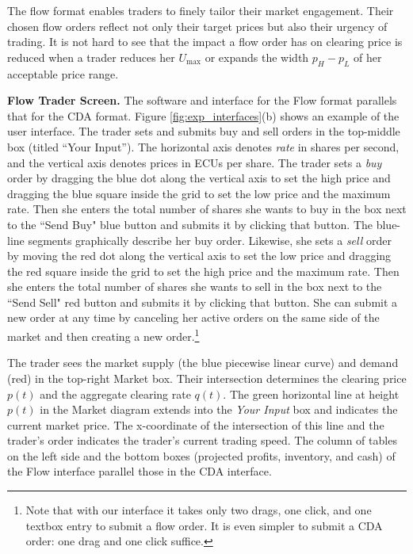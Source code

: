 \documentclass[12pt]{article}
\begin{document}
The flow format enables traders to finely tailor their market engagement. Their chosen flow orders reflect not only their target prices but also their urgency of trading. It is not hard to see that the impact a flow order has on clearing price is reduced when a trader reduces her $U_{\max}$ or expands the width $p_H - p_L$ of her acceptable price range.  

\bigskip
\noindent
\textbf{Flow Trader Screen.} 
The software and interface for the Flow format parallels that for the CDA format. 
Figure \ref{fig:exp_interfaces}(b) shows an example of the user interface.  
The trader sets and submits buy and sell orders in the top-middle box (titled ``Your Input''). The horizontal axis denotes \textit{rate} in shares per second, and the vertical axis denotes prices in ECUs per share. 
The trader sets a \textit{buy} order by dragging the blue dot along the vertical axis to set the high price and dragging the blue square inside the grid to set the low price and the maximum rate. 
Then she enters the total number of shares she wants to buy in the box next to the ``Send Buy" blue button and submits it by clicking that button. The blue-line segments graphically describe her buy order. %
Likewise, she sets a \textit{sell} order by moving the red dot along the vertical axis to set the low price and dragging the red square inside the grid to set the high price and the maximum rate. 
Then she enters the total number of shares she wants to sell in the box next to the ``Send Sell" red button and submits it by clicking that button. She can submit a new order at any time by canceling her active orders on the same side of the market and then creating a new order.\footnote{
Note that with our interface it takes only 
two drags, one click, and one textbox entry to submit a flow order. It is even simpler to submit a CDA order: one drag and one click suffice.}

The trader sees the market supply (the blue piecewise linear curve) and demand (red) in the top-right Market box. Their intersection determines the clearing price $p(t)$ and the aggregate clearing rate $q(t)$. The green horizontal line at height $p(t)$ in the Market diagram extends into the \textit{Your Input} box and indicates the current market price. The x-coordinate of the intersection of this line and the trader's order indicates the trader's current trading speed. The column of tables on the left side and the bottom boxes (projected profits, inventory, and cash) of the Flow interface parallel those in the CDA interface.  
\end{document}

